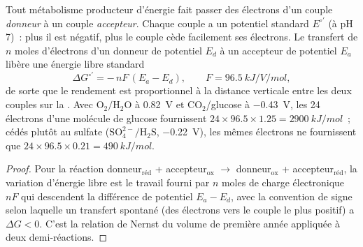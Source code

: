\begin{theorem}\label{thm:b2:microbial-metabolism:redox}
Tout métabolisme producteur d'énergie fait passer des électrons d'un
couple \emph{donneur} à un couple \emph{accepteur}. Chaque couple a un
potentiel standard $E^{\circ\prime}$ (à pH 7)~: plus il est négatif,
plus le couple cède facilement ses électrons. Le transfert de $n$ moles
d'électrons d'un donneur de potentiel $E_d$ à un accepteur de potentiel
$E_a$ libère une énergie libre standard
\[
\Delta G^{\circ\prime} = -\,n F\,(E_a - E_d), \qquad F = \qty{96.5}{kJ/V/mol},
\]
de sorte que le rendement est proportionnel à la distance verticale
entre les deux couples sur la \emph{}. Avec
$\mathrm{O_2/H_2O}$ à \qty{+0.82}{V} et $\mathrm{CO_2}$/glucose à
\qty{-0.43}{V}, les 24 électrons d'une molécule de glucose fournissent
$24\times 96.5\times 1.25 = \qty{2900}{kJ/mol}$~; cédés plutôt au
sulfate ($\mathrm{SO_4^{2-}/H_2S}$, \qty{-0.22}{V}), les mêmes
électrons ne fournissent que $24\times 96.5\times 0.21 = \qty{490}{kJ/mol}$.
\end{theorem}
\begin{proof}
Pour la réaction donneur$_{\text{réd}}$ + accepteur$_{\text{ox}}$
$\to$ donneur$_{\text{ox}}$ + accepteur$_{\text{réd}}$, la variation
d'énergie libre est le travail fourni par $n$ moles de charge
électronique $nF$ qui descendent la différence de potentiel
$E_a - E_d$, avec la convention de signe selon laquelle un transfert
spontané (des électrons vers le couple le plus positif) a
$\Delta G < 0$. C'est la relation de Nernst du volume de première année
appliquée à deux demi-réactions.
\end{proof}

